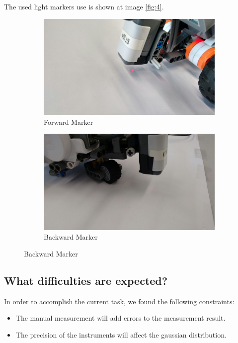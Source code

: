 \documentclass[10pt]{scrartcl}
\begin{document}
The used light markers use is shown at image \ref{fig:4}.
\begin{figure}[h!]
\centering
\caption{LEGO Nxt Robot Light Markers}
\label{fig:4}
  \begin{subfigure}[b]{0.4\textwidth}
    \includegraphics[width=\textwidth]{images/marker_1}
	\caption{Forward Marker}
	
  \end{subfigure}
  \begin{subfigure}[b]{0.4\textwidth}
    \includegraphics[width=\textwidth]{images/marker_2}
	\caption{Backward Marker}
  \end{subfigure}
\end{figure}


\subsection*{What difficulties are expected?}

In order to accomplish the current task, we found the following constraints:

\begin{itemize}
	\item The manual measurement will add errors to the measurement result.
	\item The precision of the instruments will affect the gaussian distribution.
\end{itemize}
\end{document}
